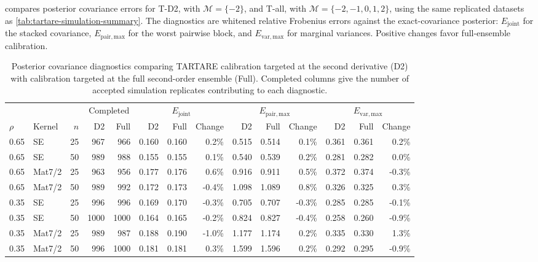 \documentclass[11pt,a4paper]{article}
\theoremstyle{definition}
\theoremstyle{remark}
\begin{document}
 compares posterior covariance errors for T-D2, with \(\mathcal M=\{-2\}\), and T-all, with \(\mathcal M=\{-2,-1,0,1,2\}\), using the same replicated datasets as \cref{tab:tartare-simulation-summary}. The diagnostics are whitened relative Frobenius errors against the exact-covariance posterior: \(E_{\mathrm{joint}}\) for the stacked covariance, \(E_{\mathrm{pair,max}}\) for the worst pairwise block, and \(E_{\mathrm{var,max}}\) for marginal variances. Positive changes favor full-ensemble calibration.

\begin{table}[htbp]
\centering
\caption{\label{tab:tartare-d2-vs-full-diagnostics}Posterior covariance diagnostics comparing TARTARE calibration targeted at the second derivative (D2) with calibration targeted at the full second-order ensemble (Full). Completed columns give the number of accepted simulation replicates contributing to each diagnostic.}
\begin{tabular}{llrrrrrrrrrrrr}
 & & & \multicolumn{2}{c}{Completed} & \multicolumn{3}{c}{$E_{\mathrm{joint}}$} & \multicolumn{3}{c}{$E_{\mathrm{pair,max}}$} & \multicolumn{3}{c}{$E_{\mathrm{var,max}}$} \\
\cmidrule(lr){4-5}\cmidrule(lr){6-8}\cmidrule(lr){9-11}\cmidrule(lr){12-14}
$\rho$ & Kernel & $n$ & D2 & Full & D2 & Full & Change & D2 & Full & Change & D2 & Full & Change \\
\midrule
0.65 & SE & 25 & 967 & 966 & 0.160 & 0.160 & 0.2\% & 0.515 & 0.514 & 0.1\% & 0.361 & 0.361 & 0.2\% \\
0.65 & SE & 50 & 989 & 988 & 0.155 & 0.155 & 0.1\% & 0.540 & 0.539 & 0.2\% & 0.281 & 0.282 & 0.0\% \\
0.65 & Mat7/2 & 25 & 963 & 956 & 0.177 & 0.176 & 0.6\% & 0.916 & 0.911 & 0.5\% & 0.372 & 0.374 & -0.3\% \\
0.65 & Mat7/2 & 50 & 989 & 992 & 0.172 & 0.173 & -0.4\% & 1.098 & 1.089 & 0.8\% & 0.326 & 0.325 & 0.3\% \\
0.35 & SE & 25 & 996 & 996 & 0.169 & 0.170 & -0.3\% & 0.705 & 0.707 & -0.3\% & 0.285 & 0.285 & -0.1\% \\
0.35 & SE & 50 & 1000 & 1000 & 0.164 & 0.165 & -0.2\% & 0.824 & 0.827 & -0.4\% & 0.258 & 0.260 & -0.9\% \\
0.35 & Mat7/2 & 25 & 989 & 987 & 0.188 & 0.190 & -1.0\% & 1.177 & 1.174 & 0.2\% & 0.335 & 0.330 & 1.3\% \\
0.35 & Mat7/2 & 50 & 996 & 1000 & 0.181 & 0.181 & 0.3\% & 1.599 & 1.596 & 0.2\% & 0.292 & 0.295 & -0.9\% \\
\end{tabular}

\end{table}
\end{document}

